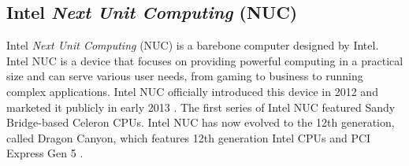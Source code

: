 \subsection{Intel \emph{Next Unit Computing} (NUC)}
\label{subsec:intelNUC}

Intel \emph{Next Unit Computing} (NUC) is a barebone computer designed by Intel. Intel NUC is a device that focuses on providing powerful computing in a practical size and can serve various user needs, from gaming to business to running complex applications. Intel NUC officially introduced this device in 2012 and marketed it publicly in early 2013 \cite{IntelNUC2020}. The first series of Intel NUC featured Sandy Bridge-based Celeron CPUs. Intel NUC has now evolved to the 12th generation, called Dragon Canyon, which features 12th generation Intel CPUs and PCI Express Gen 5 \cite{Halfacree2013}.
